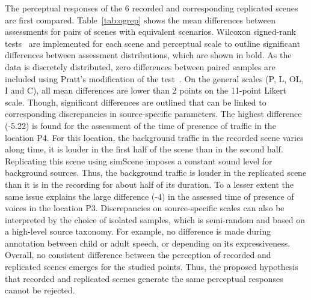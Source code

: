 \documentclass[11pt,a4paper]{article}
\begin{document}
The perceptual responses of the 6 recorded and corresponding replicated scenes are first compared. Table~\ref{tab:ogrep} shows the mean differences between assessments for pairs of scenes with equivalent scenarios. Wilcoxon signed-rank tests~\cite{wilcoxon1945} are implemented for each scene and perceptual scale to outline significant differences between assessment distributions, which are shown in bold. As the data is discretely distributed, zero differences between paired samples are included using Pratt's modification of the test~\cite{pratt1959}. On the general scales (P, L, OL, I and C), all mean differences are lower than 2 points on the 11-point Likert scale. Though, significant differences are outlined that can be linked to corresponding discrepancies in source-specific parameters. The highest difference (-5.22) is found for the assessment of the time of presence of traffic in the location P4. For this location, the background traffic in the recorded scene varies along time, it is louder in the first half of the scene than in the second half. Replicating this scene using simScene imposes a constant sound level for background sources. Thus, the background traffic is louder in the replicated scene than it is in the recording for about half of its duration. To a lesser extent the same issue explains the large difference (-4) in the assessed time of presence of voices in the location P3. Discrepancies on source-specific scales can also be interpreted by the choice of isolated samples, which is semi-random and based on a high-level source taxonomy. For example, no difference is made during annotation between child or adult speech, or depending on its expressiveness. Overall, no consistent difference between the perception of recorded and replicated scenes emerges for the studied points. Thus, the proposed hypothesis that recorded and replicated scenes generate the same perceptual responses cannot be rejected.
\end{document}
